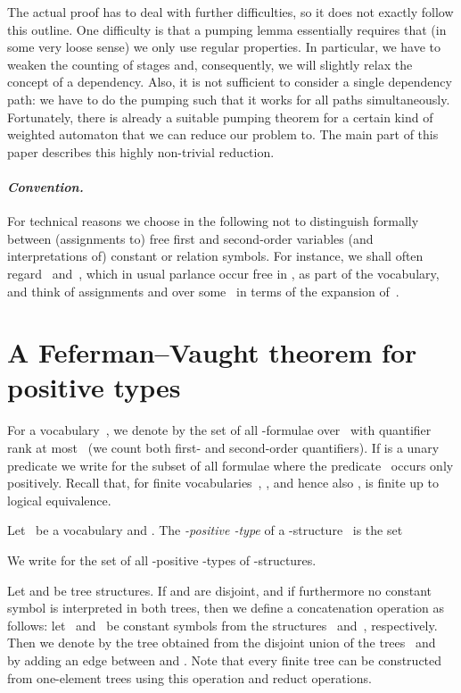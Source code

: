 \documentclass{LMCS}
\begin{document}
The actual proof has to deal with further difficulties,
so it does not exactly follow this outline.
One difficulty is that a pumping lemma essentially requires that
(in some very loose sense) we only use regular properties.
In particular, we have to weaken the counting of stages
and, consequently,
we will slightly relax the concept of a dependency.
Also, it is not sufficient to consider a single dependency path\?:
we have to do the pumping such that it works for all paths simultaneously.
Fortunately, there is already a suitable pumping theorem for a certain kind
of weighted automaton that we can reduce our problem to.
The main part of this paper describes this highly non-trivial reduction.

\paragraph*{\itshape Convention.}
For technical reasons we choose in the following not to distinguish
formally between (assignments to) free first and second-order variables
(and interpretations of) constant or relation symbols. For instance,
we shall often regard ~and~, which in usual parlance occur
free in , as part of the vocabulary, and think of
assignments  and  over some~
in terms of the expansion  of~.


\section{A Feferman--Vaught theorem for positive types}
\label{sect:Feferman-Vaught}
\label{sect:start I}


For a vocabulary~, we denote by
 the set of all -formulae
over~ with quantifier rank at most~
(we count both first- and second-order quantifiers).
If  is a unary predicate we write
 for the subset of all formulae
where the predicate~ occurs only positively.
Recall that, for finite vocabularies~, ,
and hence also ,
is finite up to logical equivalence.

\begin{defi}
Let ~be a vocabulary and .
The \emph{-positive -type} of a -structure~ is the set

We write 
for the set of all -positive -types of -structures.
\end{defi}

Let  and  be tree structures.
If  and  are disjoint,
and if furthermore no constant symbol is interpreted in both trees,
then we define a concatenation operation as follows\?:
let ~and~ be constant symbols from the structures
~and~, respectively.
Then we denote by  the tree
obtained from the disjoint union of the trees ~and~
by adding an edge between  and .
Note that every finite tree
can be constructed from one-element trees using this operation and reduct operations.
\end{document}
